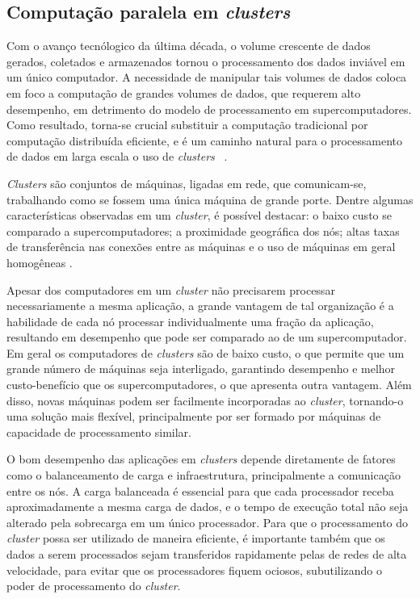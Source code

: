 \subsection{Computação paralela em \textit{clusters}}
Com o avanço tecnólogico da última década, o volume crescente de dados gerados, coletados e armazenados tornou o processamento dos dados inviável em um único computador.
A necessidade de manipular tais volumes de dados coloca em foco a computação de grandes volumes de dados, que requerem alto desempenho, em detrimento do modelo de processamento em supercomputadores.  Como resultado, torna-se crucial substituir a computação tradicional por computação distribuída eficiente, e é um caminho natural para o processamento de dados em larga escala o uso de \textit{clusters} ~\cite{Lin:2010}.

\textit{Clusters} são conjuntos de máquinas, ligadas em rede, que comunicam-se, trabalhando como se fossem uma única máquina de grande porte. 
Dentre algumas características observadas em um \textit{cluster}, é possível destacar: o baixo custo se comparado a supercomputadores; a proximidade geográfica dos nós; altas taxas de transferência nas conexões entre as máquinas e o uso de máquinas em geral homogêneas \cite{Toth:2008}.

Apesar dos computadores em um \textit{cluster} não precisarem processar necessariamente a mesma aplicação, a grande vantagem de tal organização é a habilidade de cada nó processar individualmente uma fração da aplicação, resultando em desempenho que pode ser comparado ao de um supercomputador.
Em geral os computadores de \textit{clusters} são de baixo custo, o que permite que um grande número de máquinas seja interligado, garantindo desempenho e melhor custo-benefício que os supercomputadores, o que apresenta outra vantagem. Além disso, novas máquinas podem ser facilmente incorporadas  ao \textit{cluster}, tornando-o uma solução mais flexível, principalmente por ser formado por máquinas de capacidade de processamento similar.

O bom desempenho das aplicações em \textit{clusters} depende diretamente de fatores como o balanceamento de carga e infraestrutura, principalmente a comunicação entre os nós. A carga balanceada é essencial para que cada processador receba aproximadamente a mesma carga de dados, e o tempo de execução total não seja alterado pela sobrecarga em um único processador. Para que o processamento do \textit{cluster} possa ser utilizado de maneira eficiente, é importante também que os dados a serem processados sejam transferidos rapidamente pelas de redes de alta velocidade, para evitar que os processadores fiquem ociosos, subutilizando o poder de processamento do \textit{cluster}\cite{Rauber:2010}. 


